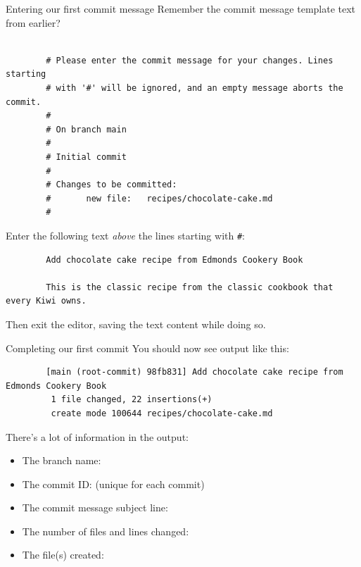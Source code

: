 \begin{frame}[fragile]{Entering our first commit message}
    Remember the commit message template text from earlier?
    \begin{verbatim}

        # Please enter the commit message for your changes. Lines starting
        # with '#' will be ignored, and an empty message aborts the commit.
        #
        # On branch main
        #
        # Initial commit
        #
        # Changes to be committed:
        #       new file:   recipes/chocolate-cake.md
        #
    \end{verbatim}

    Enter the following text \emph{above} the lines starting with \texttt{#}:
    \begin{verbatim}
        Add chocolate cake recipe from Edmonds Cookery Book

        This is the classic recipe from the classic cookbook that every Kiwi owns.
    \end{verbatim}
    Then exit the editor, saving the text content while doing so.
\end{frame}

\begin{frame}[fragile]{Completing our first commit}
    You should now see output like this:
    \begin{verbatim}
        [main (root-commit) 98fb831] Add chocolate cake recipe from Edmonds Cookery Book
         1 file changed, 22 insertions(+)
         create mode 100644 recipes/chocolate-cake.md
    \end{verbatim}

    There's a lot of information in the output:
    \begin{itemize}
        \item The branch name: 
        \item The commit ID:  (unique for each commit)
        \item The commit message subject line:
        \item The number of files and lines changed:
        \item The file(s) created:
    \end{itemize}
\end{frame}

